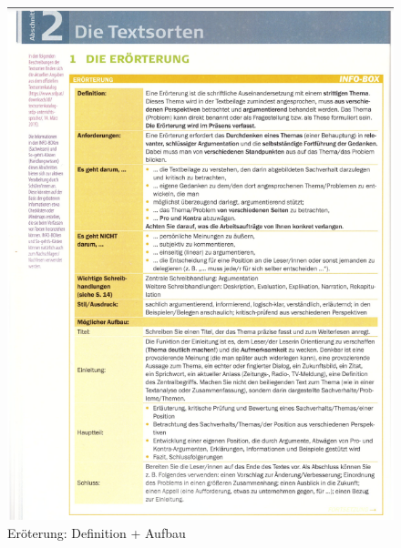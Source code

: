 \begin{figure}[h]
    \centering
    \includegraphics[scale=0.8]{pics/Screenshot from 2023-02-06 12-26-42.png}
    \caption{Eröterung: Definition + Aufbau}
    \label{fig:impl:eröterung1}
\end{figure}

